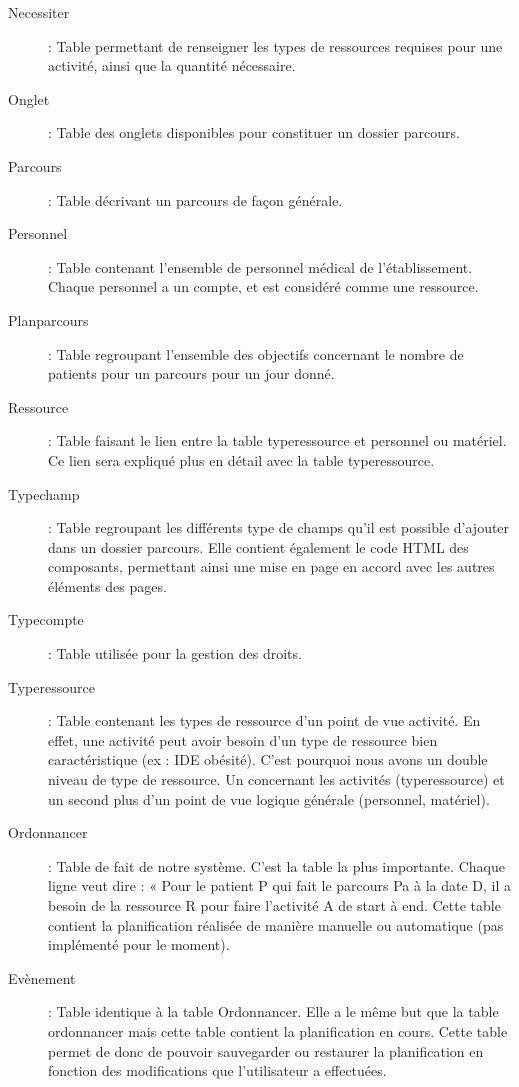 \documentclass{polytech/polytech}
\begin{document}
\begin{description}
	\item[Necessiter] : Table permettant de renseigner les types de ressources requises pour une activité, ainsi que la quantité nécessaire.
	\item[Onglet] : Table des onglets disponibles pour constituer un dossier parcours.
	\item[Parcours]	 : Table décrivant un parcours de façon générale.
	\item[Personnel] : Table contenant l'ensemble de personnel médical de l'établissement. Chaque personnel a un compte, et est considéré comme une ressource.
	\item[Planparcours] : Table regroupant l'ensemble des objectifs concernant le nombre de patients pour un parcours pour un jour donné.
	\item[Ressource] : Table faisant le lien entre la table typeressource et personnel ou matériel. Ce lien	sera expliqué plus en détail avec la table typeressource.
	\item[Typechamp] : Table regroupant les différents type de champs qu'il est possible d'ajouter dans un dossier parcours. Elle contient également le code HTML des composants, permettant ainsi une	mise en page en accord avec les autres éléments des pages.
	\item[Typecompte] : Table utilisée pour la gestion des droits.
	\item[Typeressource] : Table contenant les types de ressource d'un point de vue activité. En effet, une activité peut avoir besoin d'un type de ressource bien caractéristique (ex : IDE obésité). C'est pourquoi nous avons un double niveau de type de ressource. Un concernant les activités (typeressource) et un second plus d’un point de vue logique générale (personnel, matériel).
	\item[Ordonnancer] : Table de fait de notre système. C'est la table la plus importante. Chaque ligne veut dire : « Pour le patient P qui fait le parcours Pa à la date D, il a besoin de la ressource R pour faire l’activité A de start à end. Cette table contient la planification réalisée de manière manuelle ou automatique (pas implémenté pour le moment).
	\item[Evènement] : Table identique à la table Ordonnancer. Elle a le même but que la table ordonnancer mais cette table contient la planification en cours. Cette table permet de donc de pouvoir sauvegarder ou restaurer la planification en fonction des modifications que l’utilisateur a effectuées.
\end{description}
\end{document}
